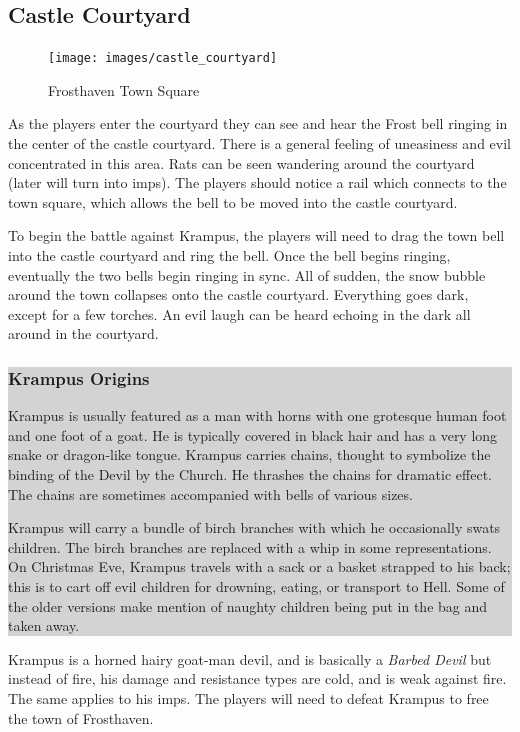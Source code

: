 \documentclass{article}
\begin{document}
\begin{multicols*}{2}
\section{Castle Courtyard}

	\begin{figure}
	\centering
	\texttt{[image: images/castle\_courtyard]}
	\caption{Frosthaven Town Square}
	\end{figure}
	
As the players enter the courtyard they can see and hear the Frost bell ringing in the center of the castle courtyard. There is a general feeling of uneasiness and evil concentrated in this area. Rats can be seen wandering around the courtyard (later will turn into imps). The players should notice a rail which connects to the town square, which allows the bell to be moved into the castle courtyard. 

To begin the battle against Krampus, the players will need to drag the town bell into the castle courtyard and ring the bell. Once the bell begins ringing, eventually the two bells begin ringing in sync. All of sudden, the snow bubble around the town collapses onto the castle 
courtyard. Everything goes dark, except for a few torches. An evil laugh can be heard echoing in the dark all around in the courtyard.

\colorbox{lightgray}{\begin{minipage}{0.4\textwidth}
\subsubsection*{Krampus Origins}
Krampus is usually featured as a man with horns with one grotesque human foot and one foot of a goat. He is typically covered in black hair and has a very long snake or dragon-like tongue. Krampus carries chains, thought to symbolize the binding of the Devil by the Church. He thrashes the chains for dramatic effect. The chains are sometimes accompanied with bells of various sizes.

Krampus will carry a bundle of birch branches with which he occasionally swats children. The birch branches are replaced with a whip in some representations. On Christmas Eve, Krampus travels with a sack or a basket strapped to his back; this is to cart off evil children for drowning, eating, or transport to Hell. Some of the older versions make mention of naughty children being put in the bag and taken away.
\end{minipage}}
\break

Krampus is a horned hairy goat-man devil, and is basically a \emph{Barbed Devil} but instead of fire, his damage and resistance types are cold, and is weak against fire. The same applies to his imps. The players will need to defeat Krampus to free the town of Frosthaven.


\end{multicols*}
\end{document}
